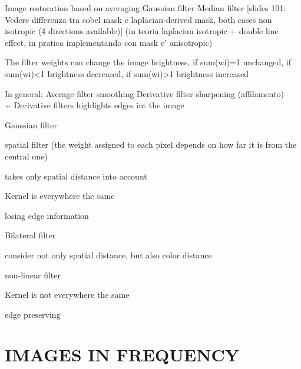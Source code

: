 \documentclass[11pt,english]{article}
\begin{document}
\medskip

Image restoration \makebox[0.5cm]{\textrightarrow} based on \makebox[0.5cm]{\textrightarrow} averaging
			      \makebox[0.5cm]{\textrightarrow} Gaussian filter
			      \makebox[0.5cm]{\textrightarrow} Median filter
[slides 101: Vedere differenza tra sobel mask e laplacian-derived mask, both cases non isotropic (4 directions available)]
(in teoria laplacian isotropic + double line effect, in pratica implementando con mask e' anisotropic)

\medskip

The filter weights can change the image brightness, if sum(wi)=1 unchanged, if sum(wi)<1 brightness decreased, if sum(wi)>1 brightness increased

\medskip

In general: 
Average filter \makebox[0.5cm]{\textrightarrow} smoothing
Derivative filter \makebox[0.5cm]{\textrightarrow} sharpening (affilamento) \\
 + Derivative filters highlights edges int the image

\medskip

Gaussian filter \par
    \makebox[1.5cm]{\textrightarrow} spatial filter (the weight assigned to each pixel depends on how far it is from the central one)\par
    \makebox[1.5cm]{\textrightarrow} takes only spatial distance into account\par
    \makebox[1.5cm]{\textrightarrow} Kernel is everywhere the same\par
    \makebox[1.5cm]{\textrightarrow} losing edge information\par

Bilateral filter \par
    \makebox[1.5cm]{\textrightarrow} consider not only spatial distance, but also color distance\par
    \makebox[1.5cm]{\textrightarrow} non-linear filter\par
    \makebox[1.5cm]{\textrightarrow} Kernel is not everywhere the same\par
    \makebox[1.5cm]{\textrightarrow} edge preserving\par

\section{IMAGES IN FREQUENCY}
							
\end{document}
